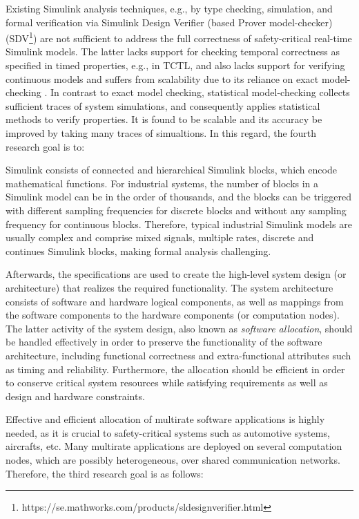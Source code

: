 Existing  Simulink analysis techniques, e.g., by type checking, simulation, and formal verification via Simulink Design Verifier (based Prover model-checker) (SDV\footnote{https://se.mathworks.com/products/sldesignverifier.html}) are not sufficient to address the full correctness of safety-critical real-time Simulink models. The latter lacks support for checking temporal correctness as specified in timed properties, e.g., in TCTL, and also lacks support for verifying continuous models and suffers from scalability due to its reliance on exact model-checking \cite{Leitner2008SimulinkStudy}. In contrast to exact model checking, statistical model-checking collects sufficient traces of system simulations, and consequently applies statistical methods to verify properties. It is found to be scalable and its accuracy be improved by taking many traces of simualtions. In this regard, the fourth research goal is to:
\begin{researchgoal}
\end{researchgoal}

Simulink consists of connected and hierarchical Simulink blocks, which encode mathematical functions. For industrial systems, the number of blocks in a Simulink model can be in the order of thousands, and the blocks can be triggered with different sampling frequencies for discrete blocks and without any sampling frequency 
for continuous blocks. Therefore, typical industrial Simulink models are usually complex and comprise mixed signals, multiple rates, discrete and continues Simulink blocks, making formal analysis challenging.

Afterwards, the specifications are used to create the high-level system design (or architecture) that realizes the required functionality. The system architecture consists of software and hardware logical components, as well as mappings from the software components to the hardware components (or computation nodes). The latter activity of the system design, also known as \textit{software allocation}, should be handled effectively in order to preserve the functionality of the software architecture, including functional correctness and extra-functional attributes such as timing and reliability. Furthermore, the allocation should be efficient in order to conserve critical system resources while satisfying requirements as well as design and hardware constraints.

Effective and efficient allocation of multirate software applications is highly needed, as it is crucial to safety-critical systems such as automotive systems, aircrafts, etc. Many multirate applications are deployed on several computation nodes, which are possibly heterogeneous, over shared communication networks. Therefore, the third research goal is as follows:
 
